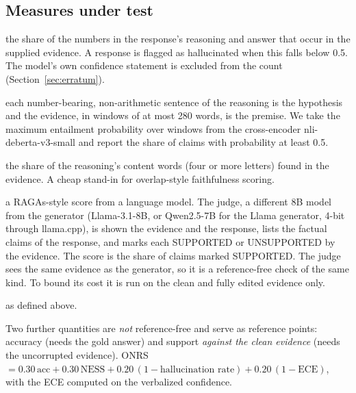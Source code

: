 \subsection{Measures under test}
\label{sec:measures}
\begin{description}[leftmargin=0pt,itemsep=1pt,topsep=2pt]
\item[Numeric-overlap support (NESS)] the share of the numbers in the response's reasoning and answer that occur in the supplied evidence. A response is flagged as hallucinated when this falls below 0.5. The model's own confidence statement is excluded from the count (Section~\ref{sec:erratum}).
\item[Entailment support] each number-bearing, non-arithmetic sentence of the reasoning is the hypothesis and the evidence, in windows of at most 280 words, is the premise. We take the maximum entailment probability over windows from the cross-encoder nli-deberta-v3-small \citep{he2021debertav3} and report the share of claims with probability at least 0.5.
\item[Lexical groundedness] the share of the reasoning's content words (four or more letters) found in the evidence. A cheap stand-in for overlap-style faithfulness scoring.
\item[LLM-judge faithfulness] a RAGAs-style score from a language model. The judge, a different 8B model from the generator (Llama-3.1-8B, or Qwen2.5-7B for the Llama generator, 4-bit through llama.cpp), is shown the evidence and the response, lists the factual claims of the response, and marks each SUPPORTED or UNSUPPORTED by the evidence. The score is the share of claims marked SUPPORTED. The judge sees the same evidence as the generator, so it is a reference-free check of the same kind. To bound its cost it is run on the clean and fully edited evidence only.
\item[Hallucination flag, self-reported confidence] as defined above.
\end{description}
Two further quantities are \emph{not} reference-free and serve as reference points: accuracy (needs the gold answer) and support \emph{against the clean evidence} (needs the uncorrupted evidence).
ONRS $=0.30\,\text{acc}+0.30\,\text{NESS}+0.20\,(1-\text{hallucination rate})+0.20\,(1-\text{ECE})$, with the ECE computed on the verbalized confidence.

